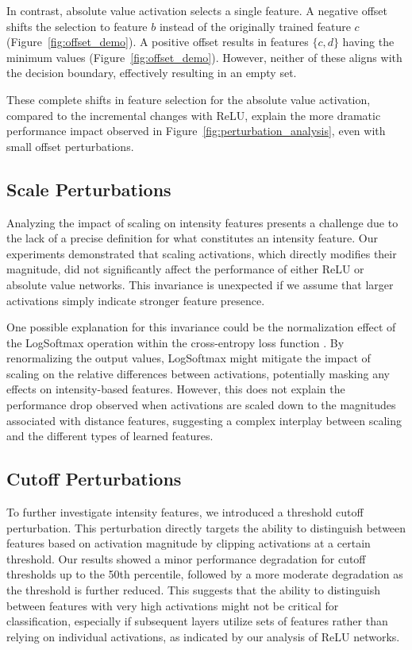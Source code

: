In contrast, absolute value activation selects a single feature. A negative offset shifts the selection to feature $b$ instead of the originally trained feature $c$ (Figure~\ref{fig:offset_demo}). A positive offset results in features $\{c, d\}$ having the minimum values (Figure~\ref{fig:offset_demo}). However, neither of these aligns with the decision boundary, effectively resulting in an empty set.

These complete shifts in feature selection for the absolute value activation, compared to the incremental changes with ReLU, explain the more dramatic performance impact observed in Figure~\ref{fig:perturbation_analysis}, even with small offset perturbations.

\subsection{Scale Perturbations}

Analyzing the impact of scaling on intensity features presents a challenge due to the lack of a precise definition for what constitutes an intensity feature. Our experiments demonstrated that scaling activations, which directly modifies their magnitude, did not significantly affect the performance of either ReLU or absolute value networks. This invariance is unexpected if we assume that larger activations simply indicate stronger feature presence.

One possible explanation for this invariance could be the normalization effect of the LogSoftmax operation within the cross-entropy loss function \citep{bridle1990probabilistic}. By renormalizing the output values, LogSoftmax might mitigate the impact of scaling on the relative differences between activations, potentially masking any effects on intensity-based features. However, this does not explain the performance drop observed when activations are scaled down to the magnitudes associated with distance features, suggesting a complex interplay between scaling and the different types of learned features.

\subsection{Cutoff Perturbations}

To further investigate intensity features, we introduced a threshold cutoff perturbation. This perturbation directly targets the ability to distinguish between features based on activation magnitude by clipping activations at a certain threshold. Our results showed a minor performance degradation for cutoff thresholds up to the 50th percentile, followed by a more moderate degradation as the threshold is further reduced. This suggests that the ability to distinguish between features with very high activations might not be critical for classification, especially if subsequent layers utilize sets of features rather than relying on individual activations, as indicated by our analysis of ReLU networks.

